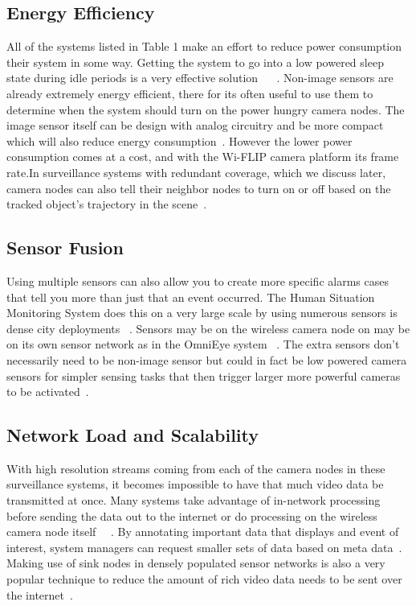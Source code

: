 \documentclass[journal,transmag]{IEEEtran}
\begin{document}
\subsection{Energy Efficiency}
All of the systems listed in Table 1 make an effort to reduce power consumption their system in some way. Getting the system to go into a low powered 
sleep state during idle periods is a very effective solution ~\cite{AccLatEnergy} ~\cite{Citric}. Non-image sensors are already extremely energy efficient, 
there for its often useful to use them to determine when the system should turn on the power hungry camera nodes. The image sensor itself can be design with
analog circuitry and be more compact which will also reduce energy consumption~\cite{WiFLIP}. However the lower power consumption comes at a cost, and with
the Wi-FLIP camera platform its frame rate.In surveillance systems with redundant coverage, which we discuss later, camera nodes can also tell their neighbor
nodes to turn on or off based on the tracked object's trajectory in the scene~\cite{SensEye}.

\subsection{Sensor Fusion}
Using multiple sensors can also allow you to create more specific alarms cases that tell you more than just that an event occurred. The Human Situation
Monitoring System does this on a very large scale by using numerous sensors is dense city deployments ~\cite{HuSIMS}. Sensors may be on the wireless camera
node on may be on its own sensor network as in the OmniEye system ~\cite{OmniEye}. The extra sensors don't necessarily need to be non-image sensor but 
could in fact be low powered camera sensors for simpler sensing tasks that then trigger larger more powerful cameras to be activated~\cite{SensEye}.

\subsection{Network Load and Scalability}
With high resolution streams coming from each of the camera nodes in these surveillance systems, it becomes impossible to have 
that much video data be transmitted at once. Many systems take advantage of in-network processing before sending the data out to the internet or do processing on
the wireless camera node itself ~\cite{HuSIMS}~\cite{OmniEye}. By annotating important data that displays and event of interest, system managers can request smaller sets 
of data based on meta data~\cite{OmniEye}. Making use of sink nodes in densely populated sensor networks is also a very popular technique to reduce the 
amount of rich video data needs to be sent over the internet~\cite{HuSIMS}.
\end{document}
